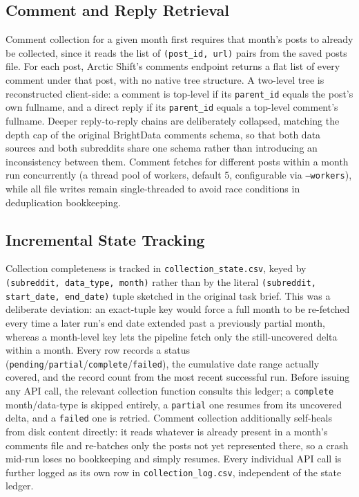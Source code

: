 \documentclass[12pt]{article}
\begin{document}
\subsection{Comment and Reply Retrieval}
Comment collection for a given month first requires that month's posts to already be collected,
since it reads the list of \texttt{(post\_id, url)} pairs from the saved posts file. For each
post, Arctic Shift's comments endpoint returns a flat list of every comment under that post, with
no native tree structure. A two-level tree is reconstructed client-side: a comment is top-level if
its \texttt{parent\_id} equals the post's own fullname, and a direct reply if its
\texttt{parent\_id} equals a top-level comment's fullname. Deeper reply-to-reply chains are
deliberately collapsed, matching the depth cap of the original BrightData comments schema, so
that both data sources and both subreddits share one schema rather than introducing an
inconsistency between them. Comment fetches for different posts within a month run concurrently
(a thread pool of workers, default 5, configurable via \texttt{--workers}), while all file writes
remain single-threaded to avoid race conditions in deduplication bookkeeping.

\subsection{Incremental State Tracking}
Collection completeness is tracked in \texttt{collection\_state.csv}, keyed by
\texttt{(subreddit, data\_type, month)} rather than by the literal \texttt{(subreddit, start\_date,
end\_date)} tuple sketched in the original task brief. This was a deliberate deviation: an
exact-tuple key would force a full month to be re-fetched every time a later run's end date
extended past a previously partial month, whereas a month-level key lets the pipeline fetch only
the still-uncovered delta within a month. Every row records a status
(\texttt{pending}/\texttt{partial}/\texttt{complete}/\texttt{failed}), the cumulative date range
actually covered, and the record count from the most recent successful run. Before issuing any
API call, the relevant collection function consults this ledger; a \texttt{complete} month/data-type
is skipped entirely, a \texttt{partial} one resumes from its uncovered delta, and a
\texttt{failed} one is retried. Comment collection additionally self-heals from disk content
directly: it reads whatever is already present in a month's comments file and re-batches only
the posts not yet represented there, so a crash mid-run loses no bookkeeping and simply resumes.
Every individual API call is further logged as its own row in \texttt{collection\_log.csv},
independent of the state ledger.
\end{document}
